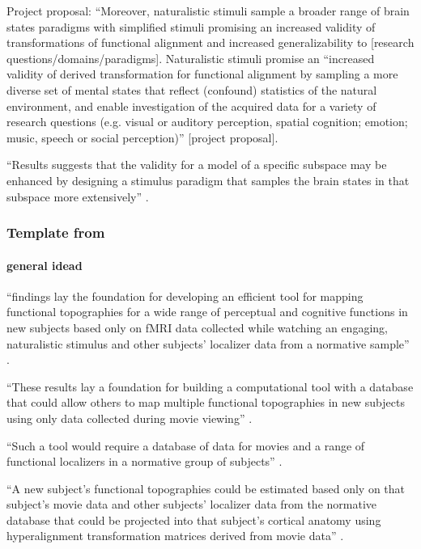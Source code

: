Project proposal: ``Moreover, naturalistic stimuli sample a broader range of
brain states paradigms with simplified stimuli \citep{guntupalli2016model,
haxby2011common} promising an increased validity of transformations of
functional alignment and increased generalizability to [research
questions/domains/paradigms].
%
Naturalistic stimuli promise an ``increased validity of derived transformation
for functional alignment by sampling a more diverse set of mental states that
reflect (confound) statistics of the natural environment, and enable
investigation of the acquired data for a variety of research questions (e.g.
visual or auditory perception, spatial cognition; emotion; music, speech or
social perception)'' [project proposal].

``Results suggests that the validity for a model of a specific subspace may be
enhanced by designing a stimulus paradigm that samples the brain states in that
subspace more extensively'' \citep{haxby2011common}.


\subsubsection{Template from \citet{jiahui2020predicting}}


\paragraph{general idead}

``findings lay the foundation for developing an efficient tool for mapping
functional topographies for a wide range of perceptual and cognitive functions
in new subjects based only on fMRI data collected while watching an engaging,
naturalistic stimulus and other subjects' localizer data from a normative
sample'' \citep{jiahui2020predicting}.

%
``These results lay a foundation for building a computational tool with a
database that could allow others to map multiple functional topographies in new
subjects using only data collected during movie viewing''
\citep{jiahui2020predicting}.

%
``Such a tool would require a database of data for movies and a range of
functional localizers in a normative group of subjects''
\citep{jiahui2020predicting}.

%
``A new subject's functional topographies could be estimated based only on that
subject's movie data and other subjects' localizer data from the normative
database that could be projected into that subject's cortical anatomy using
hyperalignment transformation matrices derived from movie data''
\citep{jiahui2020predicting}.

